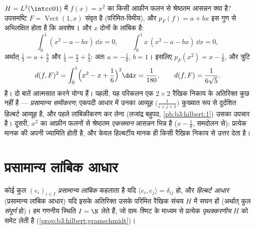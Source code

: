 \begin{example}[एक प्रक्षेप, अंत तक परिकलित]
\label{ex:b3:hilbert:projectionexample}
$H = L^2(\intcc01)$ में $f(x) = x^2$ का किसी आफ़ीन फलन से श्रेष्ठतम आसन्नन क्या है?
उपसमष्टि $F =
\operatorname{Vect}(1, x)$ संवृत है (परिमित-विमीय), और $p_F(f) = a + bx$ इस गुण से
अभिलक्षित होता है कि अवशेष $1$ और $x$ दोनों के लांबिक है:
\[
\int_0^1(x^2 - a - bx)\,\dd x = 0,
\qquad
\int_0^1x\,(x^2 - a - bx)\,\dd x = 0,
\]
अर्थात् $\frac13 = a + \frac b2$ और $\frac14 = \frac a2 +
\frac b3$: अतः $a = -\frac16$, $b = 1$। इसलिए $p_F(x^2) = x -
\frac16$, और त्रुटि
\[
d(f, F)^2 = \int_0^1\Bigl(x^2 - x + \frac16\Bigr)^2\dd x =
\frac1{180},
\qquad d(f, F) = \frac1{6\sqrt5} .
\]
है। दो बातें आत्मसात करने योग्य हैं। पहली, यह परिकलन एक $2\times2$
रैखिक निकाय के अतिरिक्त कुछ नहीं है --- \emph{प्रसामान्य समीकरण};
एकपदी आधार में उनका आव्यूह $\bigl(\frac1{i+j+1}\bigr)$ कुख्यात रूप से दुर्दशित हिल्बर्ट
आव्यूह है, और पहले लांबिकीकरण कर लेना (लजांद्र बहुपद, \cref{pb:b3:hilbert:1}) उसका
उपचार है। दूसरी, $x^2$ का आफ़ीन फलनों से श्रेष्ठतम \emph{एकसमान}
आसन्नन भिन्न है ($x - \frac18$, समदोलन से): प्रत्येक मानक की अपनी ज्यामिति
होती है, और केवल हिल्बर्टीय मानक ही किसी रैखिक निकाय से उत्तर देता
है।
\end{example}

\section{प्रसामान्य लांबिक आधार}

\begin{definition}\label{def:b3:hilbert:onb}
कोई कुल $(e_i)_{i\in I}$ \emph{प्रसामान्य लांबिक} कहलाता है यदि $\langle
e_i, e_j\rangle = \delta_{ij}$ हो,
और \emph{हिल्बर्ट आधार} (प्रसामान्य लांबिक
आधार) यदि इसके अतिरिक्त उसके परिमित रैखिक संचय $H$ में सघन हों
(अर्थात् कुल \emph{संपूर्ण} हो)। हम गणनीय स्थिति $I = \N$ लेते हैं,
जो ग्राम--श्मिट के माध्यम से प्रत्येक \emph{पृथक्करणीय} $H$ को
समेट लेती है (\cref{prop:b3:hilbert:gramschmidt})।
\end{definition}

